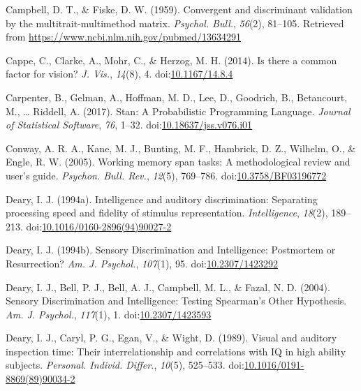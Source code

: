 \documentclass[
  ,man]{apa6}
\newlength{\cslhangindent}
\newenvironment{CSLReferences}[2] %
 {\begin{list}{}{%
  \setlength{\itemindent}{0pt}
  \setlength{\leftmargin}{0pt}
  \setlength{\parsep}{0pt}
  \ifodd #1
   \setlength{\leftmargin}{\cslhangindent}
   \setlength{\itemindent}{-1\cslhangindent}
  \fi
  \setlength{\itemsep}{#2\baselineskip}}}
 {\end{list}}
\begin{document}
\label{refs}
\begin{CSLReferences}{1}{0}
Campbell, D. T., \& Fiske, D. W. (1959). Convergent and discriminant validation by the multitrait-multimethod matrix. \emph{Psychol. Bull.}, \emph{56}(2), 81--105. Retrieved from \url{https://www.ncbi.nlm.nih.gov/pubmed/13634291}

Cappe, C., Clarke, A., Mohr, C., \& Herzog, M. H. (2014). Is there a common factor for vision? \emph{J. Vis.}, \emph{14}(8), 4. doi:\href{https://doi.org/10.1167/14.8.4}{10.1167/14.8.4}

Carpenter, B., Gelman, A., Hoffman, M. D., Lee, D., Goodrich, B., Betancourt, M., \ldots{} Riddell, A. (2017). Stan: {A Probabilistic Programming Language}. \emph{Journal of Statistical Software}, \emph{76}, 1--32. doi:\href{https://doi.org/10.18637/jss.v076.i01}{10.18637/jss.v076.i01}

Conway, A. R. A., Kane, M. J., Bunting, M. F., Hambrick, D. Z., Wilhelm, O., \& Engle, R. W. (2005). Working memory span tasks: {A} methodological review and user's guide. \emph{Psychon. Bull. Rev.}, \emph{12}(5), 769--786. doi:\href{https://doi.org/10.3758/BF03196772}{10.3758/BF03196772}

Deary, I. J. (1994a). Intelligence and auditory discrimination: {Separating} processing speed and fidelity of stimulus representation. \emph{Intelligence}, \emph{18}(2), 189--213. doi:\href{https://doi.org/10.1016/0160-2896(94)90027-2}{10.1016/0160-2896(94)90027-2}

Deary, I. J. (1994b). Sensory {Discrimination} and {Intelligence}: {Postmortem} or {Resurrection}? \emph{Am. J. Psychol.}, \emph{107}(1), 95. doi:\href{https://doi.org/10.2307/1423292}{10.2307/1423292}

Deary, I. J., Bell, P. J., Bell, A. J., Campbell, M. L., \& Fazal, N. D. (2004). Sensory {Discrimination} and {Intelligence}: {Testing Spearman}'s {Other Hypothesis}. \emph{Am. J. Psychol.}, \emph{117}(1), 1. doi:\href{https://doi.org/10.2307/1423593}{10.2307/1423593}

Deary, I. J., Caryl, P. G., Egan, V., \& Wight, D. (1989). Visual and auditory inspection time: {Their} interrelationship and correlations with {IQ} in high ability subjects. \emph{Personal. Individ. Differ.}, \emph{10}(5), 525--533. doi:\href{https://doi.org/10.1016/0191-8869(89)90034-2}{10.1016/0191-8869(89)90034-2}


\end{CSLReferences}
\end{document}
